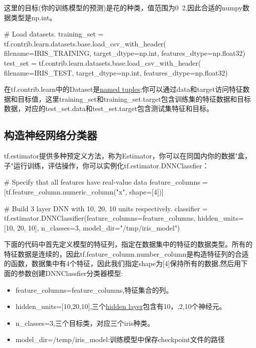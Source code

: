 这里的目标(你的训练模型的预测)是花的种类，值范围为0~2,因此合适的numpy数据类型是np.int。
\begin{python}
# Load datasets.
training_set = tf.contrib.learn.datasets.base.load_csv_with_header(
    filename=IRIS_TRAINING,
    target_dtype=np.int,
    features_dtype=np.float32)
test_set = tf.contrib.learn.datasets.base.load_csv_with_header(
    filename=IRIS_TEST,
    target_dtype=np.int,
    features_dtype=np.float32)
\end{python}
在tf.contrib.learn中的Dataset是\href{https://docs.python.org/2/library/collections.html#collections.namedtuple}{named tuples};你可以通过data和target访问特征数据和目标值，这里training\_set和training\_set.target包含训练集的特征数据和目标数据，对应的test\_set.data和test\_set.target包含测试集特征和目标。
\subsection{构造神经网络分类器}
tf.estimator提供多种预定义方法，称为Estimator，你可以在同国内你的数据"盒，子"运行训练，评估操作，你可以实例化tf.estimator.DNNClassfier：
\begin{python}
# Specify that all features have real-value data
feature_columns = [tf.feature_column.numeric_column("x", shape=[4])]

# Build 3 layer DNN with 10, 20, 10 units respectively.
classifier = tf.estimator.DNNClassifier(feature_columns=feature_columns,
                                        hidden_units=[10, 20, 10],
                                        n_classes=3,
                                        model_dir="/tmp/iris_model")
\end{python}
下面的代码中首先定义模型的特征列，指定在数据集中的特征的数据类型。所有的特征数据是连续的，因此tf.feature\_column.number\_column是构造特征列的合适的函数，数据集中有4个特征，因此我们指定shape为[4]保持所有的数据,然后用下面的参数创建DNNClassfier分类器模型:
\begin{itemize}
	\item feature_columns=feature_columns,特征集合的列。
	\item hidden\_units=[10,20,10],三个\href{http://stats.stackexchange.com/questions/181/how-to-choose-the-number-of-hidden-layers-and-nodes-in-a-feedforward-neural-netw}{hidden layer}包含有10，,2,10个神经元。
	\item n\_classes=3,三个目标类，对应三个iris种类。
	\item model\_dir=/temp/iris\_model:训练模型中保存checkpoint文件的路径
\end{itemize}
